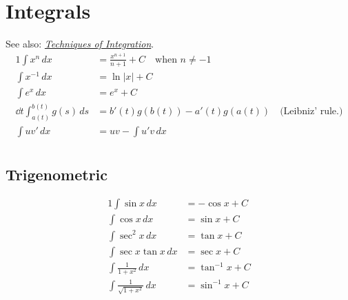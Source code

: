 \documentclass[knowledge]{mathnotes}
\begin{document}
\section{Integrals}
See also:
\emph{\href{https://www.whitman.edu/mathematics/calculus/calculus_08_Techniques_of_Integration.pdf}{Techniques
of Integration}}.
\begin{alignat*}{1}
  \int x^n\,dx &= \frac{x^{n + 1}}{n + 1} + C \quad \text{when } n \ne -1 \\
  \int x^{-1}\,dx &= \ln|x| + C \\
  \int e^x\,dx &= e^x + C \\
  \dd{t} \int_{a(t)}^{b(t)} g(s)\,ds &= b'(t) g(b(t)) - a'(t) g(a(t))
  \quad\text{(Leibniz' rule.)} \\
  \int uv'\,dx &= uv - \int u'v\,dx \\
\end{alignat*}

\subsection{Trigenometric}
\begin{alignat*}{1}
  \int \sin x\,dx &= -\cos x + C \\
  \int \cos x\,dx &= \sin x + C \\
  \int \sec^2 x\,dx &= \tan x + C \\
  \int \sec x \tan x\,dx &= \sec x + C \\
  \int \frac{1}{1 + x^2}\,dx &= \tan^{-1} x + C \\
  \int \frac{1}{\sqrt{1 + x^2}}\,dx &= \sin^{-1} x + C \\
\end{alignat*}

\printindex
\end{document}

